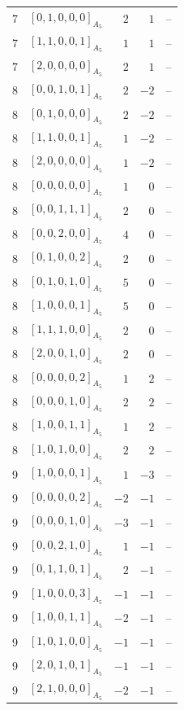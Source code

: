 \documentclass[11pt]{article}
\newcommand{\Dynkin}[1]{#1}
\begin{document}
\begin{longtable}{r l r r l}
7 & $\Dynkin{[0,1,0,0,0]_{A_5}}$ & $2$ & $1$ & --\\
7 & $\Dynkin{[1,1,0,0,1]_{A_5}}$ & $1$ & $1$ & --\\
7 & $\Dynkin{[2,0,0,0,0]_{A_5}}$ & $2$ & $1$ & --\\
8 & $\Dynkin{[0,0,1,0,1]_{A_5}}$ & $2$ & $-2$ & --\\
8 & $\Dynkin{[0,1,0,0,0]_{A_5}}$ & $2$ & $-2$ & --\\
8 & $\Dynkin{[1,1,0,0,1]_{A_5}}$ & $1$ & $-2$ & --\\
8 & $\Dynkin{[2,0,0,0,0]_{A_5}}$ & $1$ & $-2$ & --\\
8 & $\Dynkin{[0,0,0,0,0]_{A_5}}$ & $1$ & $0$ & --\\
8 & $\Dynkin{[0,0,1,1,1]_{A_5}}$ & $2$ & $0$ & --\\
8 & $\Dynkin{[0,0,2,0,0]_{A_5}}$ & $4$ & $0$ & --\\
8 & $\Dynkin{[0,1,0,0,2]_{A_5}}$ & $2$ & $0$ & --\\
8 & $\Dynkin{[0,1,0,1,0]_{A_5}}$ & $5$ & $0$ & --\\
8 & $\Dynkin{[1,0,0,0,1]_{A_5}}$ & $5$ & $0$ & --\\
8 & $\Dynkin{[1,1,1,0,0]_{A_5}}$ & $2$ & $0$ & --\\
8 & $\Dynkin{[2,0,0,1,0]_{A_5}}$ & $2$ & $0$ & --\\
8 & $\Dynkin{[0,0,0,0,2]_{A_5}}$ & $1$ & $2$ & --\\
8 & $\Dynkin{[0,0,0,1,0]_{A_5}}$ & $2$ & $2$ & --\\
8 & $\Dynkin{[1,0,0,1,1]_{A_5}}$ & $1$ & $2$ & --\\
8 & $\Dynkin{[1,0,1,0,0]_{A_5}}$ & $2$ & $2$ & --\\
9 & $\Dynkin{[1,0,0,0,1]_{A_5}}$ & $1$ & $-3$ & --\\
9 & $\Dynkin{[0,0,0,0,2]_{A_5}}$ & $-2$ & $-1$ & --\\
9 & $\Dynkin{[0,0,0,1,0]_{A_5}}$ & $-3$ & $-1$ & --\\
9 & $\Dynkin{[0,0,2,1,0]_{A_5}}$ & $1$ & $-1$ & --\\
9 & $\Dynkin{[0,1,1,0,1]_{A_5}}$ & $2$ & $-1$ & --\\
9 & $\Dynkin{[1,0,0,0,3]_{A_5}}$ & $-1$ & $-1$ & --\\
9 & $\Dynkin{[1,0,0,1,1]_{A_5}}$ & $-2$ & $-1$ & --\\
9 & $\Dynkin{[1,0,1,0,0]_{A_5}}$ & $-1$ & $-1$ & --\\
9 & $\Dynkin{[2,0,1,0,1]_{A_5}}$ & $-1$ & $-1$ & --\\
9 & $\Dynkin{[2,1,0,0,0]_{A_5}}$ & $-2$ & $-1$ & --\\

\end{longtable}
\end{document}

